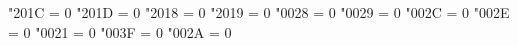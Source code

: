 


\lccode "201C = 0
\lccode "201D = 0
\lccode "2018 = 0
\lccode "2019 = 0
\lccode "0028 = 0
\lccode "0029 = 0
\lccode "002C = 0
\lccode "002E = 0
\lccode "0021 = 0
\lccode "003F = 0
\lccode "002A = 0




